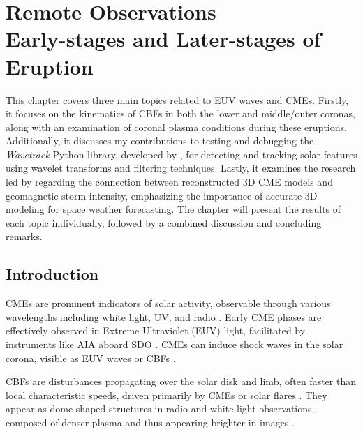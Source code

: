 \chapter[Remote Observations: Early-stages and Later-stages of Eruption]{Remote Observations\\\LARGE Early-stages and Later-stages of Eruption}
\label{chapter2}
This chapter covers three main topics related to EUV waves and CMEs. Firstly, it focuses on the kinematics of CBFs in both the lower and middle/outer coronas, along with an examination of coronal plasma conditions during these eruptions. Additionally, it discusses my contributions to testing and debugging the \textit{Wavetrack} Python library, developed by \citet{stepanyuk_2022}, for detecting and tracking solar features using wavelet transforms and filtering techniques. Lastly, it examines the research led by \citet{miteva_2023} regarding the connection between reconstructed 3D CME models and geomagnetic storm intensity, emphasizing the importance of accurate 3D modeling for space weather forecasting. The chapter will present the results of each topic individually, followed by a combined discussion and concluding remarks.

\section{Introduction}
CMEs are prominent indicators of solar activity, observable through various wavelengths including white light, UV, and radio \citep{vourlidas_2003, zhang_2006, bein_2011, bastian_2001, veronig_2010}. Early CME phases are effectively observed in Extreme Ultraviolet (EUV) light, facilitated by instruments like AIA aboard SDO \citep{lemen_2011, pesnell_2012}. CMEs can induce shock waves in the solar corona, visible as EUV waves or CBFs \citep{thompson_1998, long_2011}.

CBFs are disturbances propagating over the solar disk and limb, often faster than local characteristic speeds, driven primarily by CMEs or solar flares \citep{thompson_1998, veronig_2010, vrsnak_2008, magdaleni_2010, nindos_2011}. They appear as dome-shaped structures in radio and white-light observations, composed of denser plasma and thus appearing brighter in images \citep{pick_2006, nindos_2008, thompson_2009}.

